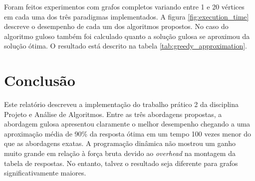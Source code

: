 \documentclass{article}
\begin{document}
Foram feitos experimentos com grafos completos variando entre 1 e 20 vértices em cada uma dos três paradigmas implementados. A figura
\ref{fig:execution_time} descreve o desempenho de cada um dos algoritmos propostos. No caso do algoritmo guloso também foi 
calculado quanto a solução gulosa se aproximou da solução ótima. O resultado está descrito na tabela \ref{tab:greedy_approximation}.

\section{Conclusão}

Este relatório descreveu a implementação do trabalho prático 2 da disciplina Projeto e Análise de Algoritmos. Entre as três abordagens
propostas, a abordagem gulosa apresentou claramente o melhor desempenho chegando a uma aproximação média de 90\% da resposta ótima
em um tempo 100 vezes menor do que as abordagens exatas. A programação dinâmica não mostrou um ganho muito grande em relação à força
bruta devido ao \textit{overhead} na montagem da tabela de respostas. No entanto, talvez o resultado seja diferente para grafos 
significativamente maiores.
\end{document}
